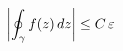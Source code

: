 \documentclass[preview]{standalone}
\begin{document}
\begin{align*}
\special{dvisvgm:raw <g id='unique000'>}\left|\oint_{\gamma} f(z)\,dz\right| \le C\,\varepsilon\special{dvisvgm:raw </g>}
\end{align*}
\end{document}

